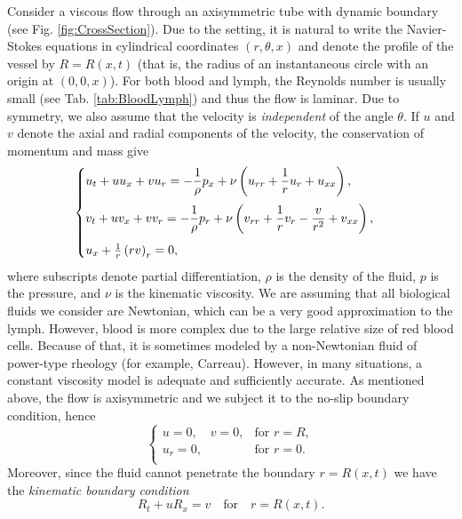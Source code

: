 \documentclass[12pt,a4paper]{article}
\begin{document}
Consider a viscous flow through an axisymmetric tube with dynamic boundary (see Fig. \ref{fig:CrossSection}). Due to the setting, it is natural to write the Navier-Stokes equations in cylindrical coordinates $(r,\theta,x)$ and denote the profile of the vessel by $R=R(x,t)$ (that is, the radius of an instantaneous circle with an origin at $(0, 0, x)$). For both blood and lymph, the Reynolds number is usually small (see Tab. \ref{tab:BloodLymph}) and thus the flow is laminar. Due to symmetry, we also assume that the velocity is \emph{independent} of the angle $\theta$. If $u$ and $v$ denote the axial and radial components of the velocity, the conservation of momentum and mass give
\begin{equation}\label{eqn:NSDim}
	\begin{cases}
		u_t + u u_x + v u_r = - \dfrac{1}{\rho} p_x + \nu \left(u_{rr}+ \dfrac{1}{r} u_r + u_{xx}\right), \vspace{6pt}\\
		v_t + u v_x + v v_r = - \dfrac{1}{\rho} p_r + \nu \left(v_{rr}+\dfrac{1}{r} v_r - \dfrac{v}{r^2} + v_{xx}\right), \vspace{6pt}\\
		u_x + \frac{1}{r} \left(r v\right)_r = 0, \\
	\end{cases}
\end{equation}
where subscripts denote partial differentiation, $\rho$ is the density of the fluid, $p$ is the pressure, and $\nu$ is the kinematic viscosity. We are assuming that all biological fluids we consider are Newtonian, which can be a very good approximation to the lymph. However, blood is more complex due to the large relative size of red blood cells. Because of that, it is sometimes modeled by a non-Newtonian fluid of power-type rheology (for example, Carreau). However, in many situations, a constant viscosity model is adequate and sufficiently accurate. As mentioned above, the flow is axisymmetric and we subject it to the no-slip boundary condition, hence
\begin{equation}\label{eqn:Boundary}
	\begin{cases}
		u = 0, \quad v = 0, & \text{for } r = R, \\
		u_r = 0, & \text{for } r = 0. \\
	\end{cases}
\end{equation}
Moreover, since the fluid cannot penetrate the boundary $r = R(x,t)$ we have the \textit{kinematic boundary condition}
\begin{equation}\label{eqn:BoundaryKinametic}
	R_t + u R_x = v \quad \text{for} \quad r = R(x,t). 
\end{equation}
\end{document}
